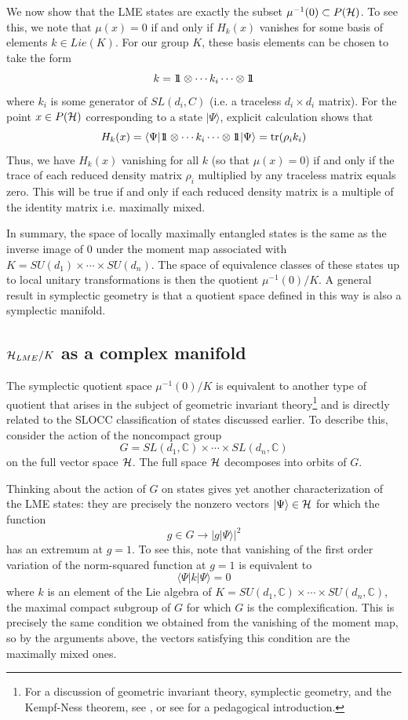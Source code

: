 \documentclass[12pt]{article}
\theoremstyle{definition}
\newcommand{\be}{\begin{equation}}
\newcommand{\ee}{\end{equation}}
\def\identity{{\rlap{1} \hskip 1.6pt \hbox{1}}}
\newcommand{\tr}{{\rm tr}}
\begin{document}
We now show that the LME states are exactly the subset $\mu^{-1}(0) \subset P({\cal H})$. To see this, we note that $\mu(x) = 0$ if and only if $H_k(x)$ vanishes for some basis of elements $k \in Lie(K)$. For our group $K$, these basis elements can be chosen to take the form
\be
k = \identity \otimes \cdots k_i \cdots \otimes \identity
\ee
where $k_i$ is some generator of $SL(d_i,C)$ (i.e. a traceless $d_i \times d_i$ matrix). For the point $x \in P({\cal H})$ corresponding to a state $|\Psi \rangle$, explicit calculation shows that
\be
H_k(x) = \langle \Psi| \identity \otimes \cdots k_i \cdots \otimes \identity | \Psi \rangle = \tr (\rho_i k_i)
\ee
Thus, we have $H_k(x)$ vanishing for all $k$ (so that $\mu(x)=0$) if and only if the trace of each reduced density matrix $\rho_i$ multiplied by any traceless matrix equals zero. This will be true if and only if each reduced density matrix is a multiple of the identity matrix i.e. maximally mixed.

In summary, the space of locally maximally entangled states is the same as the inverse image of $0$ under the moment map associated with $K = SU(d_1) \times \cdots \times SU(d_n)$. The space of equivalence classes of these states up to local unitary transformations is then the quotient $\mu^{-1}(0)/K$. A general result in symplectic geometry is that a quotient space defined in this way is also a symplectic manifold.

\subsection{${\cal H}_{LME}/K$ as a complex manifold}

The symplectic quotient space $\mu^{-1}(0)/K$ is equivalent to another type of quotient that arises in the subject of geometric invariant theory\footnote{For a discussion of geometric
invariant theory, symplectic geometry, and the Kempf-Ness theorem, see
\cite{mfk}, or see \cite{Hoskins} for a pedagogical introduction.} and is directly related to the SLOCC classification of states discussed earlier. To describe this, consider the action of the noncompact group
\be
G = SL(d_1,\mathbb{C}) \times \cdots \times SL(d_n,\mathbb{C})
\ee
on the full vector space ${\cal H}$. The full space ${\cal H}$ decomposes into orbits of $G$.

Thinking about the action of $G$ on states gives yet another characterization of the LME states: they are precisely the nonzero vectors $|\Psi \rangle \in {\cal H}$ for which the function
\be
\label{KNfunction}
g \in G \to |g |\Psi \rangle|^2
\ee
has an extremum at $g=1$. To see this, note that vanishing of the first order variation of the norm-squared function at $g=1$ is equivalent to
\be
\langle \Psi| k |\Psi \rangle = 0
\ee
where $k$ is an element of the Lie algebra of $K = SU(d_1,\mathbb{C}) \times \cdots \times SU(d_n, \mathbb{C})$, the maximal compact subgroup of $G$ for which $G$ is the complexification. This is precisely the same condition we obtained from the vanishing of the moment map, so by the arguments above, the vectors satisfying this condition are the maximally mixed ones.
\end{document}
